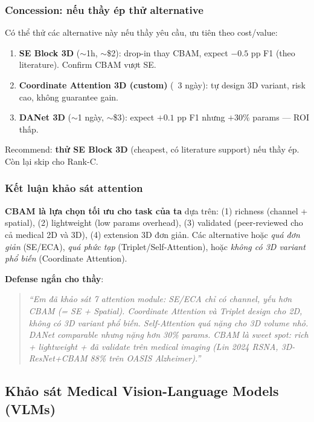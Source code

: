\documentclass[11pt,a4paper]{article}
\begin{document}
\subsubsection*{Concession: nếu thầy ép thử alternative}

\noindent Có thể thử các alternative này nếu thầy yêu cầu, ưu tiên
theo cost/value:

\begin{enumerate}[leftmargin=*]
\item \textbf{SE Block 3D} ($\sim$1h, $\sim$\$2): drop-in thay CBAM,
expect $-0.5$ pp F1 (theo literature). Confirm CBAM vượt SE.
\item \textbf{Coordinate Attention 3D (custom)} (~3 ngày): tự design
3D variant, risk cao, không guarantee gain.
\item \textbf{DANet 3D} ($\sim$1 ngày, $\sim$\$3): expect $+0.1$ pp F1
nhưng $+30\%$ params --- ROI thấp.
\end{enumerate}

\noindent Recommend: \textbf{thử SE Block 3D} (cheapest, có literature
support) nếu thầy ép. Còn lại skip cho Rank-C.

\subsubsection*{Kết luận khảo sát attention}

\noindent \textbf{CBAM là lựa chọn tối ưu cho task của ta} dựa trên:
(1) richness (channel + spatial), (2) lightweight (low params overhead),
(3) validated (peer-reviewed cho cả medical 2D và 3D), (4) extension
3D đơn giản. Các alternative hoặc \emph{quá đơn giản} (SE/ECA),
\emph{quá phức tạp} (Triplet/Self-Attention), hoặc \emph{không có 3D
variant phổ biến} (Coordinate Attention).

\noindent \textbf{Defense ngắn cho thầy}:
\begin{quote}
\emph{``Em đã khảo sát 7 attention module: SE/ECA chỉ có channel,
yếu hơn CBAM (= SE + Spatial). Coordinate Attention và Triplet design
cho 2D, không có 3D variant phổ biến. Self-Attention quá nặng cho 3D
volume nhỏ. DANet comparable nhưng nặng hơn 30\% params. CBAM là sweet
spot: rich + lightweight + đã validate trên medical imaging (Lin 2024
RSNA, 3D-ResNet+CBAM 88\% trên OASIS Alzheimer).''}
\end{quote}

\subsection{Khảo sát Medical Vision-Language Models (VLMs)}
\end{document}
